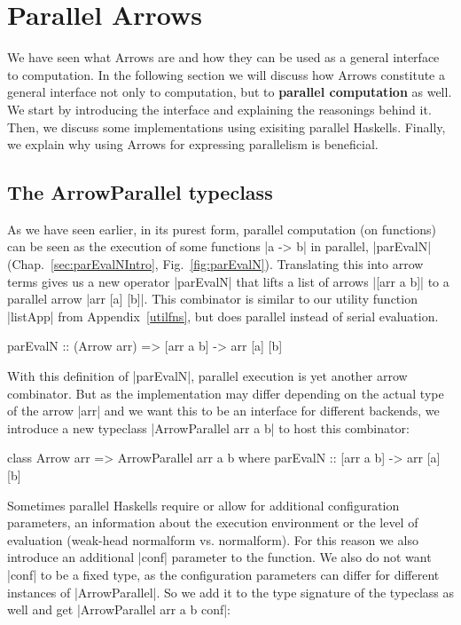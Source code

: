 \section{Parallel Arrows}
\label{sec:parallel-arrows}
We have seen what Arrows are and how they can be used as a general interface to computation. In the following section we will discuss how Arrows constitute a general interface not only to computation, but to \textbf{parallel computation} as well. We start by introducing the interface and explaining the reasonings behind it. Then, we discuss some implementations using exisiting parallel Haskells. Finally, we explain why using Arrows for expressing parallelism is beneficial.
\subsection{The ArrowParallel typeclass}
As we have seen earlier, in its purest form, parallel computation (on functions) can be seen as the execution of some functions |a -> b| in parallel, |parEvalN| (Chap.~\ref{sec:parEvalNIntro}, Fig.~\ref{fig:parEvalN}).
Translating this into arrow terms gives us a new operator |parEvalN| that lifts a list of arrows |[arr a b]| to a parallel arrow |arr [a] [b]|. %
This combinator is similar to our utility function |listApp| from Appendix~\ref{utilfns}, but does parallel instead of serial evaluation.
\begin{code}
parEvalN :: (Arrow arr) => [arr a b] -> arr [a] [b]
\end{code}
With this definition of |parEvalN|, parallel execution is yet another arrow combinator. But as the implementation may differ depending on the actual type of the arrow |arr| and we want this to be an interface for different backends, we introduce a new typeclass |ArrowParallel arr a b| to host this combinator: %
\begin{code}
class Arrow arr => ArrowParallel arr a b where
	parEvalN :: [arr a b] -> arr [a] [b]
\end{code}
Sometimes parallel Haskells require or allow for additional configuration parameters, \eg an information about the execution environment or the level of evaluation (weak-head normalform vs. normalform). For this reason we also introduce an additional |conf| parameter to the function. We also do not want |conf| to be a fixed type, as the configuration parameters can differ for different instances of |ArrowParallel|. So we add it to the type signature of the typeclass as well and get |ArrowParallel arr a b conf|: %
